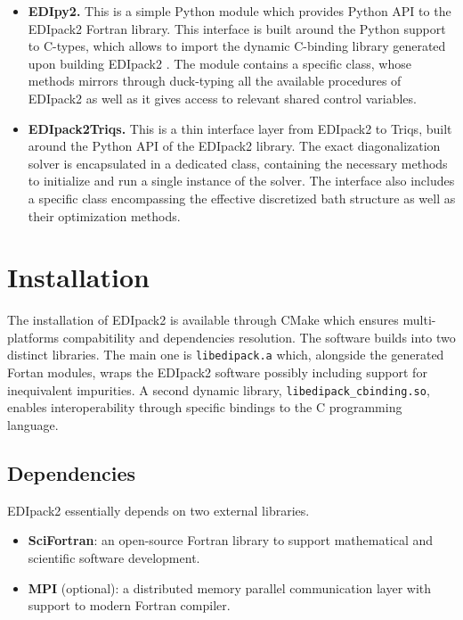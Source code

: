 \documentclass[preprint,3p,10pt]{elsarticle}
\def\NAME{{\rm EDIpack2 }}
\begin{document}
\begin{itemize}
\item{\bf EDIpy2.}
This is a simple Python module which provides Python API to the
\NAME Fortran library. This interface is built around the Python
support to C-types, which allows to import the dynamic C-binding
library generated upon building \NAME. The module contains a specific
class, whose methods mirrors through  duck-typing all the available
procedures of \NAME as well as it gives access to relevant shared
control variables.




\item{\bf EDIpack2Triqs.}
This is a thin interface layer from \NAME to Triqs,
built around the Python API of the \NAME library. The exact
diagonalization solver is encapsulated in a dedicated class,
containing the necessary methods to initialize and run a single
instance of the solver. The interface also includes a specific class
encompassing the effective discretized bath structure as well as their 
optimization methods.  

  
\end{itemize}








\section{Installation}\label{SecInstall}
The installation of \NAME is available through CMake which ensures
multi-platforms compabitility and dependencies resolution.  
The software builds into two distinct libraries.
The main one is {\tt  libedipack.a} which, alongside the generated Fortan
modules, wraps the \NAME software possibly including support for  
inequivalent impurities.
A second dynamic library, {\tt libedipack\_cbinding.so}, enables interoperability through
specific bindings to the C programming language.    

\subsection{Dependencies}
\NAME essentially depends on two external libraries.
\begin{itemize}
\item {\bf SciFortran}: an open-source Fortran library to support
  mathematical and scientific software development. 
\item {\bf MPI} (optional): a distributed memory parallel communication layer with support to modern Fortran compiler.
\end{itemize}
 
\end{document}

